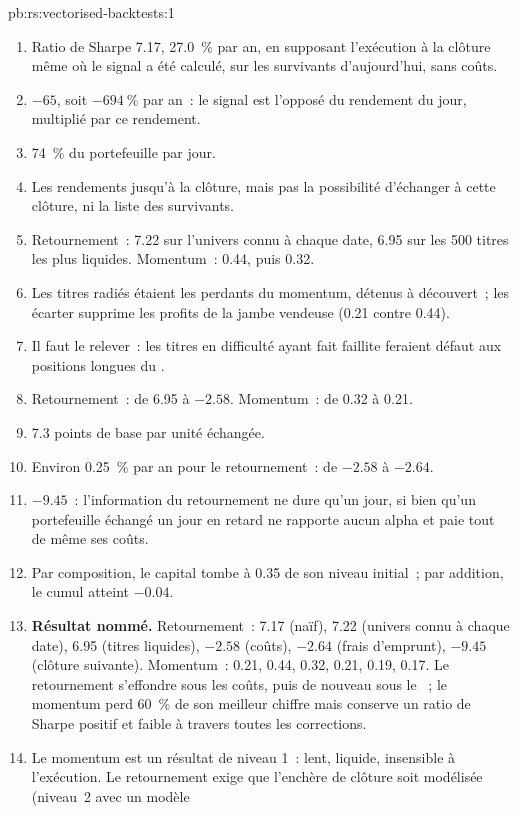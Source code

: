 \begin{solution}{pb:rs:vectorised-backtests:1}
\begin{enumerate}
\item Ratio de Sharpe 7.17, 27.0~\% par an, en supposant l'exécution à la clôture même où le signal a été calculé, sur les survivants d'aujourd'hui, sans coûts.
\item $-65$, soit $-694~\%$ par an~: le signal est l'opposé du rendement du jour, multiplié par ce rendement.
\item 74~\% du portefeuille par jour.
\item Les rendements jusqu'à la clôture, mais pas la possibilité d'échanger à cette clôture, ni la liste des survivants.
\item Retournement~: 7.22 sur l'univers connu à chaque date, 6.95 sur les 500 titres les plus liquides. Momentum~: 0.44, puis 0.32.
\item Les titres radiés étaient les perdants du momentum, détenus à découvert~; les écarter supprime les profits de la jambe vendeuse (0.21 contre 0.44).
\item Il faut le relever~: les titres en difficulté ayant fait faillite feraient défaut aux positions longues du .
\item Retournement~: de 6.95 à $-2.58$. Momentum~: de 0.32 à 0.21.
\item 7.3 points de base par unité échangée.
\item Environ 0.25~\% par an pour le retournement~: de $-2.58$ à $-2.64$.
\item $-9.45$~: l'information du retournement ne dure qu'un jour, si bien qu'un portefeuille échangé un jour en retard ne rapporte aucun alpha et paie tout de même ses coûts.
\item Par composition, le capital tombe à 0.35 de son niveau initial~; par addition, le cumul atteint $-0.04$.
\item \textbf{Résultat nommé.} Retournement~: 7.17 (naïf), 7.22 (univers connu à chaque date), 6.95 (titres liquides), $-2.58$ (coûts), $-2.64$ (frais d'emprunt), $-9.45$ (clôture suivante).
Momentum~: 0.21, 0.44, 0.32, 0.21, 0.19, 0.17. Le retournement s'effondre sous les coûts, puis de nouveau sous le ~; le momentum perd 60~\% de son meilleur chiffre mais conserve un
ratio de Sharpe positif et faible à travers toutes les corrections.
\item Le momentum est un résultat de niveau 1~: lent, liquide, insensible à l'exécution. Le retournement exige que l'enchère de clôture soit modélisée (niveau~2 avec un modèle

\end{enumerate}
\end{solution}
